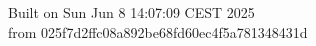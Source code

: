 {\noindent Built on Sun Jun  8 14:07:09 CEST 2025} \\ 
 {\noindent from 025f7d2ffc08a892be68fd60ec4f5a781348431d}
